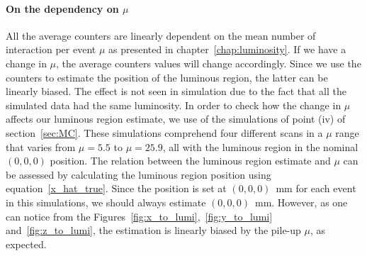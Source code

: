 \paragraph{On the dependency on $\mu$}\label{sec:mu_dependency}
All the average counters are linearly dependent on the mean number of interaction per event $\mu$ as presented in chapter~\ref{chap:luminosity}. If we have a change in $\mu$, the average counters values will change accordingly. Since we use the counters to estimate the position of the luminous region, the latter can be linearly biased. The effect is not seen in simulation due to the fact that all the simulated data had the same luminosity. In order to check how the change in $\mu$ affects our luminous region estimate, we  use of the simulations of point (iv) of section~\ref{sec:MC}. These simulations comprehend four different scans in a $\mu$ range that varies from $\mu=5.5$ to $\mu=25.9$, all with the luminous region in the nominal $(0,0,0)$ position. 
The relation between the luminous region estimate and $\mu$ can be assessed by calculating the luminous region position using equation~\eqref{x_hat_true}. Since the position is set at $(0,0,0)$~mm for each event in this simulations, we should always estimate $(0,0,0)$~mm. However, as one can notice from the Figures~\ref{fig:x_to_lumi},~\ref{fig:y_to_lumi} and~\ref{fig:z_to_lumi}, the estimation is linearly biased by the pile-up $\mu$, as expected. 
